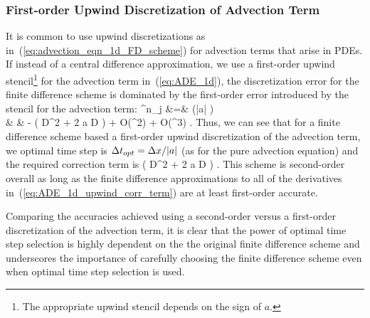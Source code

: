 \documentclass[oneeqnum,onefignum,onetabnum,onethmnum]{siamltex}
\begin{document}
\subsubsection*{First-order Upwind Discretization of Advection Term}
It is common to use upwind discretizations as 
in~(\ref{eq:advection_eqn_1d_FD_scheme}) for advection terms that arise
in PDEs.  If instead of a central difference approximation, we use a
first-order upwind stencil\footnote{The appropriate upwind stencil depends
on the sign of $a$.} for the advection term in~(\ref{eq:ADE_1d}), the 
discretization error for the finite difference scheme is dominated by the 
first-order error introduced by the stencil for the advection term:
\bea
  \tau^n_j &=&
       (|a| \dt)
  \nonumber \\
   & & 
    -  
      \left( D^2   
           + 2 a D 
      \right)
      + O(\dt \dx^2) + O(\dt^3)
  \label{eq:ADE_1d_upwind_err_eqn}.
\eea
Thus, we can see that for a finite difference scheme based a first-order
upwind discretization of the advection term, we optimal time step is 
$\Delta t_{opt} = \Delta x/|a|$ (as for the pure advection equation) and the required
correction term is
\beq
      \left( D^2   
           + 2 a D 
      \right)
  \label{eq:ADE_1d_upwind_corr_term}.
\eeq
This scheme is second-order overall as long as the finite difference 
approximations to all of the derivatives in~(\ref{eq:ADE_1d_upwind_corr_term})
are at least first-order accurate.

Comparing the accuracies achieved using a second-order versus a 
first-order discretization of the advection term, it is clear that 
the power of optimal time step selection is highly dependent on the 
the original finite difference scheme and underscores the importance of
carefully choosing the finite difference scheme even when optimal time
step selection is used.
\end{document}
